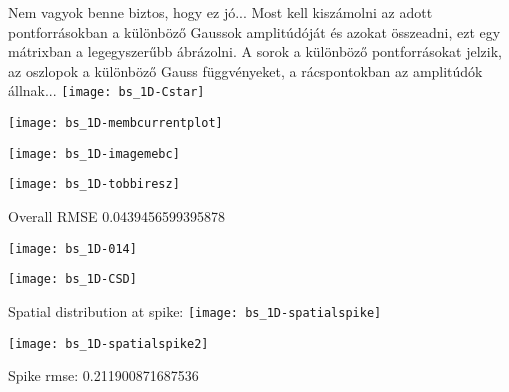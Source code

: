 \documentclass[10pt,a4paper]{report}
\begin{document}
Nem vagyok benne biztos, hogy ez jó...
Most kell kiszámolni az adott pontforrásokban a különböző Gaussok amplitúdóját és azokat összeadni, ezt egy mátrixban a legegyszerűbb ábrázolni. A sorok a különböző pontforrásokat jelzik, az oszlopok a különböző Gauss függvényeket, a rácspontokban az amplitúdók állnak...
\texttt{[image: bs\_1D-Cstar]}

\texttt{[image: bs\_1D-membcurrentplot]}

\texttt{[image: bs\_1D-imagemebc]}



\texttt{[image: bs\_1D-tobbiresz]}



\begin{Schunk}
\begin{Soutput}
Overall RMSE 0.0439456599395878
\end{Soutput}
\end{Schunk}
\texttt{[image: bs\_1D-014]}

\texttt{[image: bs\_1D-CSD]}


Spatial distribution at spike:
\texttt{[image: bs\_1D-spatialspike]}

\texttt{[image: bs\_1D-spatialspike2]}
\begin{Schunk}
\begin{Soutput}
Spike rmse: 0.211900871687536
\end{Soutput}
\end{Schunk}
\end{document}
